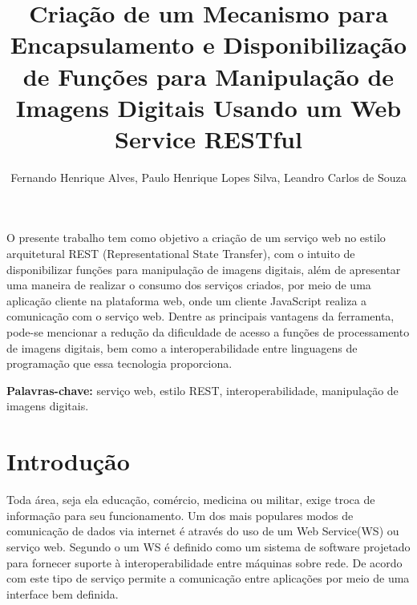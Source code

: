 \documentclass[12pt]{article}
\title{Criação de um Mecanismo para Encapsulamento e Disponibilização de Funções para Manipulação de Imagens Digitais Usando um Web Service RESTful}
\author{Fernando Henrique Alves\inst{1}, Paulo Henrique Lopes Silva\inst{1}, Leandro Carlos de Souza\inst{1}}
\begin{document}
 

\maketitle


\begin{resumo} 
  O presente trabalho tem como objetivo a criação de um serviço web no estilo arquitetural REST (Representational State Transfer), com o intuito de disponibilizar funções para manipulação de imagens digitais, além de apresentar uma maneira de realizar o consumo dos serviços criados, por meio de uma aplicação cliente na plataforma web, onde um cliente JavaScript realiza a comunicação com o serviço web. Dentre as principais vantagens da ferramenta, pode-se mencionar a redução da dificuldade de acesso a funções de processamento de imagens digitais, bem como a interoperabilidade entre linguagens de programação que essa tecnologia proporciona.
  
\end{resumo}
\textbf{Palavras-chave:} serviço web, estilo REST, interoperabilidade, manipulação de imagens digitais.

\section{Introdução}

Toda área, seja ela educação, comércio, medicina ou militar, exige troca de informação para seu funcionamento. 
Um dos mais populares modos de comunicação de dados via internet é através do uso de um Web Service(WS) ou serviço web.
Segundo o \cite{w3c1} um WS é definido como um sistema de software projetado para fornecer suporte à interoperabilidade entre máquinas sobre rede.
De acordo com  \cite{cerami:02} este tipo
de serviço permite a comunicação entre aplicações por meio de uma interface bem
definida.
\end{document}
